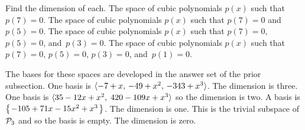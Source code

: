 
\begin{Exercise}[
name={},
title={}, 
difficulty=0,
origin={\cite{JH}}]
Find the dimension of each.
\Question The space of cubic polynomials $p(x)$ such that $p(7)=0$.
\Question The space of cubic polynomials $p(x)$ such
        that $p(7)=0$ and~$p(5)=0$.
\Question The space of cubic polynomials $p(x)$ such
        that $p(7)=0$, $p(5)=0$, and~$p(3)=0$.
\Question The space of cubic polynomials $p(x)$ such
        that $p(7)=0$, $p(5)=0$, $p(3)=0$, and~$p(1)=0$.
\end{Exercise}

\begin{Answer}
The bases for these spaces are developed 
in the answer set of the prior subsection.
\Question One basis is \( \langle-7+x,\,-49+x^2,\,-343+x^3\rangle \).
          The dimension is three.
\Question One basis is $\langle35-12x+x^2,\;420-109x+x^3\rangle$ so the
          dimension is two.
\Question A basis is $\mbox{$\left\{\hspace{0.1em}-105+71x-15x^2+x^3\hspace{0.1em}\right\}$}$.
          The dimension is one.
\Question This is the trivial subspace of $\mathcal{P}_3$ and so the 
          basis is empty.
          The dimension is zero.

\end{Answer}
